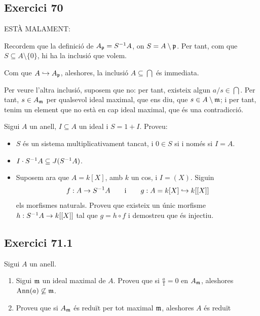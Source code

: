 \documentclass[11pt, a4paper]{article}
\begin{document}
\subsection{Exercici 70}
ESTÀ MALAMENT:\par
Recordem que la definició de $A_\mathfrak p = S^{-1} A$, on $S = A\setminus \mathfrak p$. Per tant, com que $S\subseteq A\setminus \{0\}$, hi ha la inclusió que volem.\par
Com que $A\hookrightarrow A_\mathfrak p$, aleshores, la inclusió $A\subseteq \bigcap$ és immediata.\par
Per veure l'altra inclusió, suposem que no: per tant, existeix algun $a/s\in \bigcap$. Per tant, $s\in A_\mathfrak m$ per qualsevol ideal maximal, que ens diu, que $s\in A\setminus \mathfrak m$; i per tant, tenim un element que no està en cap ideal maximal, que és una contradicció.
\newpage
\begin{tcolorbox}[title=\section{Exercici 71}]
    Sigui $A$ un anell, $I\subseteq A$ un ideal i $S=1+I$. Proveu:
    \begin{itemize}
        \item $S$ és un sistema multiplicativament tancat, i $0\in S$ si i només si $I=A$.
        \item $I\cdot S^{-1} A\subseteq J(S^{-1} A)$.
        \item Suposem ara que $A=k[X]$, amb $k$ un cos, i $I=(X)$. Siguin
        \[
            f:A\to S^{-1} A\qquad \text i \qquad g:A=k[X]\hookrightarrow k[[X]]
        \]
        els morfismes naturals. Proveu que existeix un únic morfisme $h:S^{-1} A\to k[[X]]$ tal que $g=h\circ f$ i demostreu que és injectiu.
    \end{itemize}
\end{tcolorbox}
\subsection{Exercici 71.1}

\newpage
\begin{tcolorbox}[title=\section{Exercici 72}]
    Sigui $A$ un anell.
    \begin{enumerate}
        \item Sigui $\mathfrak m$ un ideal maximal de $A$. Proveu que si $\frac{a}{1}=0$ en $A_{\mathfrak m}$, aleshores $\mathrm{Ann}(a)\not\subseteq \mathfrak m$.
        \item Proveu que si $A_\mathfrak m$ és reduït per tot maximal $\mathfrak m$, aleshores $A$ és reduït
    \end{enumerate}
\end{tcolorbox}
\end{document}

